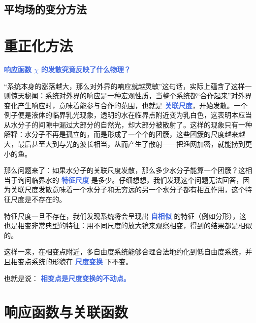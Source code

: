 \subsection{平均场的变分方法}\label{sub:平均场的变分方法}


\section{重正化方法}

\textcolor{RoyalBlue}{\textbf{\kaishu 响应函数 $\chi$ 的发散究竟反映了什么物理？}}

“系统本身的涨落越大，那么对外界的响应就越灵敏”这句话，实际上蕴含了这样一则惊天秘闻：系统对外界的响应是一种宏观性质，当整个系统都“合作起来”对外界变化产生响应时，意味着能参与合作的范围，也就是 \textcolor{RoyalBlue}{\textbf{\kaishu 关联尺度}}，开始发散。一个例子便是液体的临界乳光现象，透明的水在临界点附近变为乳白色，这表明本应当从水分子的间隙中漏过大部分的自然光，却大部分被散射了。这样的现象只有一种解释：水分子不再是孤立的，而是形成了一个个的团簇，这些团簇的尺度越来越大，最后甚至大到与光的波长相当，从而产生了散射——把渔网加密，就能捞到更小的鱼。

那么问题来了：如果水分子的关联尺度发散，那么多少水分子能算一个团簇？这相当于询问临界水的 \textcolor{RoyalBlue}{\textbf{\kaishu 特征尺度}} 是多少。仔细想想，我们发现这个问题无法回答，因为关联尺度发散意味着一个水分子和无穷远的另一个水分子都有相互作用，这个特征尺度是不存在的。

特征尺度一旦不存在，我们发现系统将会呈现出 \textcolor{RoyalBlue}{\textbf{\kaishu 自相似}} 的特征（例如分形），这也是相变非常典型的特征：用不同尺度的放大镜来观察相变，得到的结果都是相似的。

这样一来，在相变点附近，多自由度系统能够合理合法地约化到低自由度系统，并且相变点系统的形貌在 \textcolor{RoyalBlue}{\textbf{\kaishu 尺度变换}} 下不变。

也就是说： \textcolor{RoyalBlue}{\textbf{\kaishu 相变点是尺度变换的不动点。}}

\section{响应函数与关联函数}\label{sec:响应函数与关联函数}

